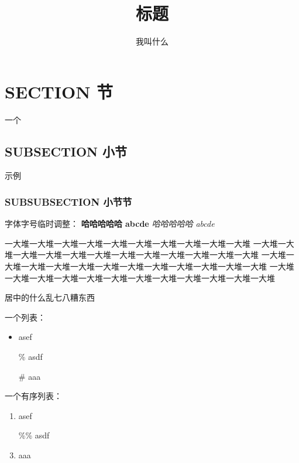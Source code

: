\documentclass[UTF8,zihao=5]{ctexart} %
\title{{\bfseries\rmfamily\Huge 标题}}
\author{我叫什么}
\date{}
\begin{document}
\maketitle
\begin{center}
    \rmfamily
    \tableofcontents\setcounter{page}{0}
\end{center}
\thispagestyle{empty}

\newpage


\section{SECTION 节}

一个

\subsection{SUBSECTION 小节}

示例

\subsubsection{SUBSUBSECTION 小节节}

字体字号临时调整：
{
   \sffamily\bfseries{} 哈哈哈哈哈 abcde %
}
{ 
   \itshape 哈哈哈哈哈 abcde%
}

一大堆一大堆一大堆一大堆一大堆一大堆一大堆一大堆一大堆一大堆
一大堆一大堆一大堆一大堆一大堆一大堆一大堆一大堆一大堆一大堆一大堆一大堆
一大堆一大堆一大堆一大堆一大堆一大堆一大堆一大堆一大堆一大堆一大堆一大堆
一大堆一大堆一大堆一大堆一大堆一大堆一大堆一大堆一大堆一大堆一大堆一大堆

\begin{center}
    居中的什么乱七八糟东西
\end{center}


一个列表：
\begin{itemize}
    \item asef
    \item[\%] asdf
    \item[\#] aaa
\end{itemize}

一个有序列表：
\begin{enumerate}
    \item asef
    \item[\%\%] asdf
    \item aaa
\end{enumerate}
\end{document}
